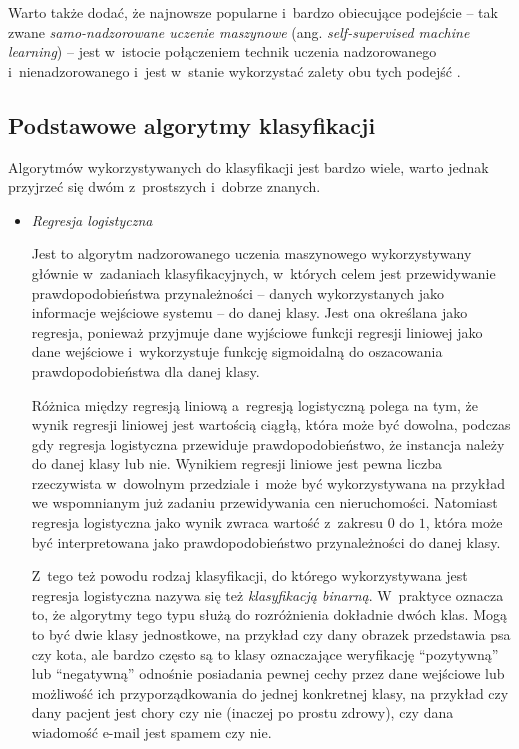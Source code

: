 Warto także dodać, że najnowsze popularne i~bardzo obiecujące podejście -- tak zwane \emph{samo-nadzorowane uczenie maszynowe} (ang. \emph{self-supervised machine learning}) -- jest w~istocie połączeniem technik uczenia nadzorowanego i~nienadzorowanego i~jest w~stanie wykorzystać zalety obu tych podejść \cite{krishnan2022self}.

\subsection{Podstawowe algorytmy klasyfikacji}

Algorytmów wykorzystywanych do klasyfikacji jest bardzo wiele, warto jednak przyjrzeć się dwóm z~prostszych i~dobrze znanych.

\begin{itemize}

  \item \emph{Regresja logistyczna}

        Jest to algorytm nadzorowanego uczenia maszynowego wykorzystywany głównie w~zadaniach klasyfikacyjnych, w~których celem jest przewidywanie prawdopodobieństwa przynależności  -- danych wykorzystanych jako informacje wejściowe systemu -- do danej klasy.
        Jest ona określana jako regresja, ponieważ przyjmuje dane wyjściowe funkcji regresji liniowej jako dane wejściowe i~wykorzystuje funkcję sigmoidalną do oszacowania prawdopodobieństwa dla danej klasy.

        Różnica między regresją liniową a~regresją logistyczną polega na tym, że wynik regresji liniowej jest wartością ciągłą, która może być dowolna, podczas gdy regresja logistyczna przewiduje prawdopodobieństwo, że instancja należy do danej klasy lub nie.
        Wynikiem regresji liniowe jest pewna liczba rzeczywista w~dowolnym przedziale i~może być wykorzystywana na przykład we wspomnianym już zadaniu przewidywania cen nieruchomości.
        Natomiast regresja logistyczna jako wynik zwraca wartość z~zakresu $0$ do $1$, która może być interpretowana jako prawdopodobieństwo przynależności do danej klasy.

        Z~tego też powodu rodzaj klasyfikacji, do którego wykorzystywana jest regresja logistyczna nazywa się też \emph{klasyfikacją binarną}.
        W~praktyce oznacza to, że algorytmy tego typu służą do rozróżnienia dokładnie dwóch klas.
        Mogą to być dwie klasy jednostkowe, na przykład czy dany obrazek przedstawia psa czy kota, ale bardzo często są to klasy oznaczające weryfikację ``pozytywną'' lub ``negatywną'' odnośnie posiadania pewnej cechy przez dane wejściowe lub możliwość ich przyporządkowania do jednej konkretnej klasy, na przykład czy dany pacjent jest chory czy nie (inaczej po prostu zdrowy), czy dana wiadomość e-mail jest spamem czy nie.


\end{itemize}

